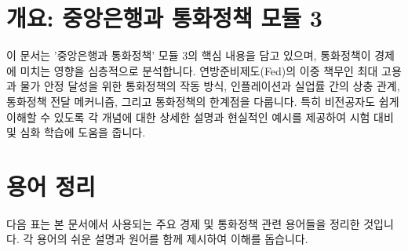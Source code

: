 \documentclass[11pt,a4paper]{article}
\begin{document}
\newpage
\section*{개요: 중앙은행과 통화정책 모듈 3}

이 문서는 '중앙은행과 통화정책' 모듈 3의 핵심 내용을 담고 있으며, 통화정책이 경제에 미치는 영향을 심층적으로 분석합니다. 연방준비제도(Fed)의 이중 책무인 최대 고용과 물가 안정 달성을 위한 통화정책의 작동 방식, 인플레이션과 실업률 간의 상충 관계, 통화정책 전달 메커니즘, 그리고 통화정책의 한계점을 다룹니다. 특히 비전공자도 쉽게 이해할 수 있도록 각 개념에 대한 상세한 설명과 현실적인 예시를 제공하여 시험 대비 및 심화 학습에 도움을 줍니다.

\newpage
\section*{용어 정리}

다음 표는 본 문서에서 사용되는 주요 경제 및 통화정책 관련 용어들을 정리한 것입니다. 각 용어의 쉬운 설명과 원어를 함께 제시하여 이해를 돕습니다.
\end{document}
